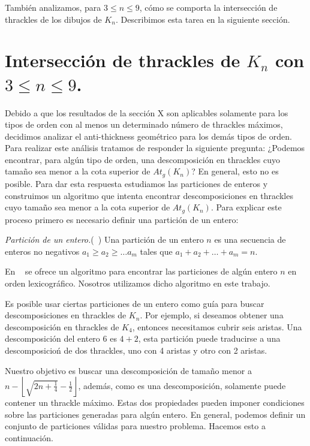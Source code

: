   También analizamos, para $ 3\leq n\leq 9$, cómo
  se comporta la intersección de thrackles de los dibujos de $K_n$. Describimos
  esta tarea en la siguiente sección.


  \section{Intersección de thrackles de $K_n$ con $3\leq n \leq 9$.}

    Debido a que los resultados de la sección X son aplicables solamente para los tipos de orden con al menos un determinado número de thrackles máximos, decidimos analizar el anti-thickness geométrico para los demás tipos de orden. Para realizar este análisis tratamos de responder la siguiente pregunta: ¿Podemos encontrar, para algún tipo de orden, una descomposición en thrackles cuyo tamaño sea menor a la cota superior de $At_g(K_n)$? En general, esto no es posible. Para dar esta respuesta estudiamos las particiones de enteros y construimos un algoritmo que intenta encontrar descomposiciones en thrackles cuyo tamaño sea menor a la cota superior de $At_g(K_n)$. Para explicar este proceso primero es necesario definir una partición de un entero:

    \begin{definition}{\emph{Partición de un entero.}(~\cite{Knuth2011})}
      Una partición de un entero $n$ es una secuencia de enteros no negativos $a_1 \geq a_2 \geq \dots a_m$ tales que $a_1 + a_2 + \dots + a_m = n$.
    \end{definition}

    En ~\cite{Knuth2011} se ofrece un algoritmo para encontrar las particiones de algún entero $n$ en orden lexicográfico. Nosotros utilizamos dicho algoritmo en este trabajo.

    Es posible usar ciertas particiones de un entero como guía para buscar descomposiciones en thrackles de $K_n$. Por ejemplo, si  deseamos obtener una descomposición en thrackles de $K_4$, entonces necesitamos cubrir seis aristas. Una descomposición del entero 6 es $4+2$, esta partición puede traducirse a una descomposicioń de dos thrackles, uno con 4 aristas y otro con 2 aristas.

    Nuestro objetivo es buscar una descomposición de tamaño menor a $n - \left\lfloor\sqrt{2n+\frac{1}{4}} - \frac{1}{2}\right\rfloor$, además, como es una descomposición, solamente puede contener un thrackle máximo. Estas dos propiedades pueden imponer condiciones sobre las particiones generadas para algún entero. En general, podemos definir un conjunto de particiones válidas para nuestro problema. Hacemos esto a continuación.

